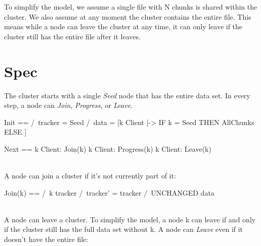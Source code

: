 To simplify the model, we assume a single file with N chunks is shared within
the cluster. We also assume at any moment the cluster contains the entire file.
This means while a node can leave the cluster at any time, it can only leave if
the cluster still has the entire file after it leaves.


\section{Spec}

The cluster starts with a single \textit{Seed} node that has the entire data
set. In every step, a node can \textit{Join}, \textit{Progress}, or
\textit{Leave}.\\

\begin{tla}
Init ==
    /\ tracker = {Seed}
    /\ data = [k \in Client |-> IF k = Seed THEN AllChunks ELSE {}]

Next ==
    \/ \E k \in Client: 
        Join(k) 
    \/ \E k \in Client: 
        Progress(k)
    \/ \E k \in Client: 
        Leave(k)
\end{tla}
\begin{tlatex}
%
%
\@pvspace{8.0pt}%
%
%
%
%
%
%
%
\end{tlatex}
\\

A node can join a cluster if it's not currently part of it:\\
\begin{tla}
Join(k) == 
    /\ k \notin tracker
    /\ tracker' = tracker 
    /\ UNCHANGED data
\end{tla}
\begin{tlatex}
%
%
%
%
\end{tlatex}
\\

A node can leave a cluster. To simplify the model, a node k can leave if and
only if the cluster still has the full data set without k. A node can
\textit{Leave} even if it doesn't have the entire file:\\

